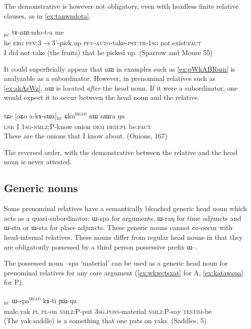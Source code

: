 \documentclass[oldfontcommands,oneside,a4paper,11pt]{article}
\newcommand{\ipa}[1]{{\phon #1}} %
\newcommand{\topic}{\textsc{dem}}
\newcommand{\tete}{\textsuperscript{\textsc{head}}}
\newcommand{\rc}{\textsubscript{\textsc{rc}}}
\begin{document}
The demonstrative is however not obligatory, even with  headless finite relative clauses, as in \ref{ex:tanwndota}.

     \begin{exe}
   \ex \label{ex:tanwndota}
 \gll [\ipa{ɯʑo}	\ipa{kɯ}  	\ipa{ta-nɯrdoʁ}]\rc{}  	\ipa{tɤ-nɯ-ndo-t-a}  	\ipa{me}  \\
he \textsc{erg} \textsc{pfv:3$\rightarrow$3'}-pick.up  \textsc{pfv-auto}-take-\textsc{pst:tr-1sg} not.exist:\textsc{fact} \\
\glt I did not take (the fruits) that he picked up. (Sparrow and Mouse 55)
\end{exe}

It could superficially appear that \ipa{nɯ} in examples such as  \ref{ex:pWkABRum} is analyzable as a subordinator. However, in prenominal relatives such as \ref{ex:akAsWz}, \ipa{nɯ} is located \textit{after} the head noun. If it were a subordinator, one would expect it to occur between the head noun and the relative.

\begin{exe}
   \ex \label{ex:akAsWz}
 \gll
\ipa{tɕe}  	[\ipa{aʑo}  	\ipa{a-kɤ-sɯz}]\rc{}  	\ipa{ɕku}\tete{}  	\ipa{nɯ}  	\ipa{nɯra}  	\ipa{ŋu}  \\
\textsc{lnk} I \textsc{1sg-nmlz:P}-know onion \topic{} \textsc{dem:pl} be:\textsc{fact} \\
\glt These are the onions that I know about.  (Onions, 167)
\end{exe}

The reversed order, with the demonstrative between the relative and the head noun is never attested.

\subsection{Generic nouns} \label{sec:generic.noun}
Some prenominal relatives have a semantically bleached generic head noun which acts as a quasi-subordinator: \ipa{ɯ-spa} for arguments, \ipa{ɯ-raŋ} for time adjuncts and \ipa{ɯ-stu} or \ipa{ɯ-sta} for place adjuncts. These generic nouns cannot co-occur with head-internal relatives. These nouns differ from regular head nouns in that they are obligatorily possessed by a third person possessive prefix \ipa{ɯ}--.


The possessed noun \ipa{--spa} `material' can be used as a generic head noun for prenominal relatives for any core argument (\ref{ex:wkwctsxat} for A, \ref{ex:katawspa} for P).

     \begin{exe}
   \ex \label{ex:katawspa}
 \gll  [\ipa{qambrɯ}   	\ipa{ra}   	\ipa{nɯ-taʁ}   	\ipa{kɤ-ta}]\rc{}   	\ipa{ɯ-spa}\tete{}   	\ipa{kɤ-ti}   	\ipa{ɲɯ-ŋu}   \\
male.yak \textsc{pl} \textsc{pl}-on \textsc{nmlz:P}-put \textsc{3sg.poss}-material \textsc{nmlz:P}-say \textsc{testim}-be \\
\glt (The yak saddle) is a something that one puts on  yaks. (Saddles, 5)
\end{exe}
\end{document}
